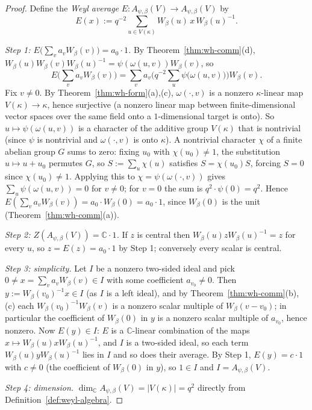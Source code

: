 \begin{proof}
Define the \emph{Weyl average} $E : A_{\psi,\beta}(V) \to A_{\psi,\beta}(V)$
by
\[
E(x) := q^{-2}\sum_{u\in V(\kappa)} W_\beta(u)\, x\, W_\beta(u)^{-1}.
\]

\emph{Step 1: $E\big(\sum_v a_v W_\beta(v)\big) = a_0\cdot 1$.} By
Theorem~\ref{thm:wh-comm}(d), $W_\beta(u)W_\beta(v)W_\beta(u)^{-1} =
\psi(\omega(u,v))W_\beta(v)$, so
\[
E\Big(\sum_v a_v W_\beta(v)\Big) = \sum_v a_v \Big(q^{-2}\sum_u \psi\big(\omega(u,v)\big)\Big) W_\beta(v).
\]
Fix $v\neq 0$. By Theorem~\ref{thm:wh-form}(a),(c), $\omega(\cdot,v)$ is a
nonzero $\kappa$-linear map $V(\kappa)\to\kappa$, hence surjective (a nonzero
linear map between finite-dimensional vector spaces over the same field onto
a $1$-dimensional target is onto). So $u\mapsto\psi(\omega(u,v))$ is a
character of the additive group $V(\kappa)$ that is nontrivial (since $\psi$
is nontrivial and $\omega(\cdot,v)$ is onto $\kappa$). A nontrivial character
$\chi$ of a finite abelian group $G$ sums to zero: fixing $u_0$ with
$\chi(u_0)\neq 1$, the substitution $u\mapsto u+u_0$ permutes $G$, so
$S:=\sum_u\chi(u)$ satisfies $S=\chi(u_0)S$, forcing $S=0$ since
$\chi(u_0)\neq 1$. Applying this to $\chi = \psi(\omega(\cdot,v))$ gives
$\sum_u\psi(\omega(u,v))=0$ for $v\neq 0$; for $v=0$ the sum is
$q^2\cdot\psi(0)=q^2$. Hence $E(\sum_v a_vW_\beta(v)) = a_0\cdot W_\beta(0) =
a_0\cdot 1$, since $W_\beta(0)$ is the unit (Theorem~\ref{thm:wh-comm}(a)).

\emph{Step 2: $Z(A_{\psi,\beta}(V)) = \mathbb{C}\cdot 1$.} If $z$ is central
then $W_\beta(u)zW_\beta(u)^{-1}=z$ for every $u$, so $z=E(z)=a_0\cdot 1$ by
Step 1; conversely every scalar is central.

\emph{Step 3: simplicity.} Let $I$ be a nonzero two-sided ideal and pick
$0\neq x=\sum_v a_vW_\beta(v) \in I$ with some coefficient $a_{v_0}\neq 0$.
Then $y := W_\beta(v_0)^{-1}x \in I$ (as $I$ is a left ideal), and by
Theorem~\ref{thm:wh-comm}(b),(c) each $W_\beta(v_0)^{-1}W_\beta(v)$ is a
nonzero scalar multiple of $W_\beta(v-v_0)$; in particular the coefficient of
$W_\beta(0)$ in $y$ is a nonzero scalar multiple of $a_{v_0}$, hence nonzero.
Now $E(y)\in I$: $E$ is a $\mathbb{C}$-linear combination of the maps
$x\mapsto W_\beta(u)xW_\beta(u)^{-1}$, and $I$ is a two-sided ideal, so each
term $W_\beta(u)yW_\beta(u)^{-1}$ lies in $I$ and so does their average. By
Step 1, $E(y)=c\cdot 1$ with $c\neq 0$ (the coefficient of $W_\beta(0)$ in
$y$), so $1\in I$ and $I=A_{\psi,\beta}(V)$.

\emph{Step 4: dimension.} $\dim_{\mathbb{C}}A_{\psi,\beta}(V)=|V(\kappa)|=q^2$
directly from Definition~\ref{def:weyl-algebra}.
\end{proof}

